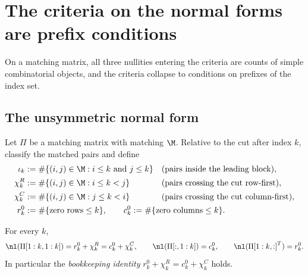 \section{The criteria on the normal forms are prefix conditions}\label{sec:combinatorics}

On a matching matrix, all three nullities entering the criteria are counts
of simple combinatorial objects, and the criteria collapse to conditions on
prefixes of the index set.

\subsection{The unsymmetric normal form}

Let $\Pi$ be a matching matrix with matching $\M$.  Relative to the cut
after index $k$, classify the matched pairs and define
\begin{align*}
  \iota_k &:= \#\{(i,j) \in \M : i \le k \text{ and } j \le k\}
  && \text{(pairs inside the leading block)},\\
  \chi^R_k &:= \#\{(i,j) \in \M : i \le k < j\}
  && \text{(pairs crossing the cut row-first)},\\
  \chi^C_k &:= \#\{(i,j) \in \M : j \le k < i\}
  && \text{(pairs crossing the cut column-first)},\\
  r^0_k &:= \#\{\text{zero rows} \le k\},
  \qquad
  c^0_k := \#\{\text{zero columns} \le k\}. \hspace{-12em}
\end{align*}

\begin{lemma}\label{lem:null-matching}
  For every $k$,
  \begin{equation}\label{eq:null-matching}
    \nl(\Pi[1:k,1:k]) = r^0_k + \chi^R_k = c^0_k + \chi^C_k,
    \qquad
    \nl(\Pi[:,1:k]) = c^0_k,
    \qquad
    \nl({\Pi[1:k,:]}^T) = r^0_k .
  \end{equation}
  In particular the \emph{bookkeeping identity}
  $r^0_k + \chi^R_k = c^0_k + \chi^C_k$ holds.
\end{lemma}

